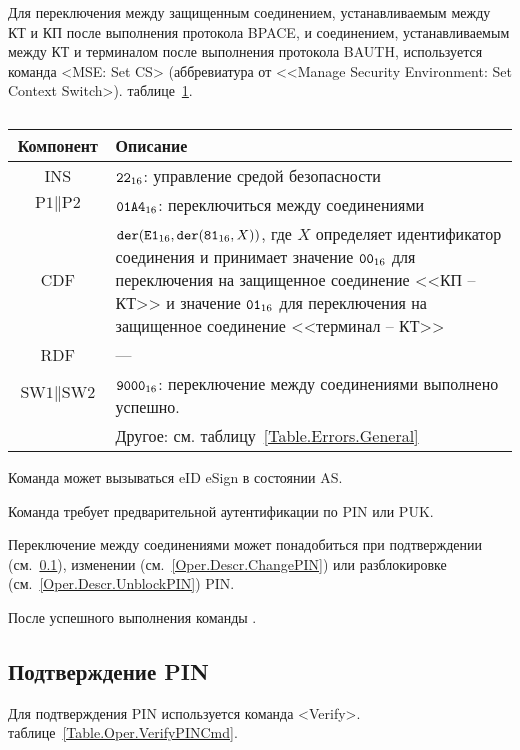 Для переключения между защищенным соединением,
устанавливаемым между КТ и КП после выполнения 
протокола BPACE, и соединением, 
устанавливаемым между КТ и терминалом после выполнения 
протокола BAUTH, используется команда <MSE: Set CS> (аббревиатура от <<Manage 
Security Environment: Set Context Switch>).
 таблице~\ref{Table.Oper.SetCSCmd}.

\begin{table}[hbt]
\caption{}\label{Table.Oper.SetCSCmd}
\begin{tabular}{|c|p{14cm}|}
\hline
Компонент & Описание \\
\hline
\hline
INS & $\texttt{22}_{16}$: управление средой безопасности\\ 
\hline
$\text{P1} \parallel\text{P2}$ & $\texttt{01A4}_{16}$: 
переключиться между соединениями \\
\hline
CDF & 
$\texttt{der}(\texttt{E1}_{16}, \texttt{der}(\texttt{81}_{16}, X))$, 
где $X$ определяет идентификатор
соединения и принимает значение $\texttt{00}_{16}$ для
переключения на защищенное соединение <<КП -- КТ>>
и значение $\texttt{01}_{16}$ для переключения на защищенное
соединение <<терминал -- КТ>>\\ 
\hline 
RDF &  --- \\
\hline
$\text{SW1} \parallel \text{SW2}$ & 
$\texttt{9000}_{16}$: переключение между соединениями выполнено успешно. \\
 & Другое: см. таблицу~\ref{Table.Errors.General} \\
\hline
\end{tabular}
\end{table}

Команда может вызываться  eID  eSign
в состоянии AS.

Команда требует предварительной аутентификации по PIN или PUK.

Переключение между соединениями может понадобиться
при подтверждении (см.~\ref{Oper.Descr.VerifyPIN}), 
изменении (см.~\ref{Oper.Descr.ChangePIN})
или разблокировке (см.~\ref{Oper.Descr.UnblockPIN}) PIN.

После успешного выполнения команды . 

\subsection{Подтверждение PIN}
\label{Oper.Descr.VerifyPIN}

Для подтверждения PIN используется команда <Verify>. 
 таблице~\ref{Table.Oper.VerifyPINCmd}.

